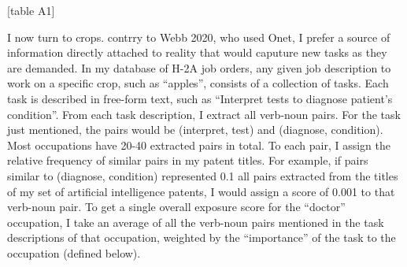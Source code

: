 \documentclass[11pt]{article}
\begin{document}
[table A1]

I now turn to crops. contrry to Webb 2020, who used Onet, I prefer a source of information directly
 attached to reality that would caputure new tasks as they are demanded.
In my database of H-2A job orders, any given job description to work on a specific crop, such as
“apples”, consists of a collection of tasks. Each task is described in free-form text, such as “Interpret
tests to diagnose patient’s condition”. From each task description, I extract all verb-noun pairs.
For the task just mentioned, the pairs would be (interpret, test) and (diagnose, condition). Most
occupations have 20-40 extracted pairs in total. To each pair, I assign the relative frequency of similar
pairs in my patent titles. For example, if pairs similar to (diagnose, condition) represented 0.1%
all pairs extracted from the titles of my set of artificial intelligence patents, I would assign a score of
0.001 to that verb-noun pair. To get a single overall exposure score for the “doctor” occupation, I
take an average of all the verb-noun pairs mentioned in the task descriptions of that occupation,
weighted by the “importance” of the task to the occupation (defined below).
\end{document}
